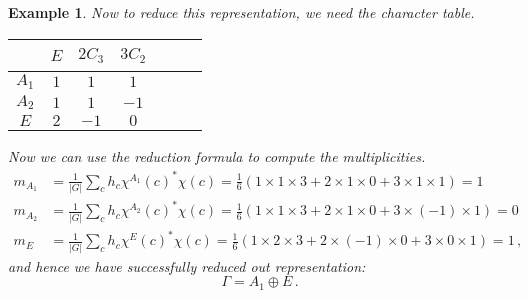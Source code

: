 \documentclass{article}
\theoremstyle{plain}\theoremheaderfont{\normalfont\itshape}\theorembodyfont{\rmfamily}\theoremseparator{.}\newtheorem*{rem}{Remark}\newtheorem*{ex}{Example}\newtheorem*{proof}{Proof}\newtheorem*{altp}{Alternative proof}
\theoremstyle{plain}\theoremheaderfont{\normalfont\bfseries}\theorembodyfont{\rmfamily}\theoremseparator{.}\newtheorem{thm}{Theorem}[section]\newtheorem{lem}[thm]{Lemma}\newtheorem{prop}[thm]{Proposition}\newtheorem*{cor}{Corollary}\newtheorem{defn}[thm]{Definition}\newtheorem{clm}[thm]{Claim}\newtheorem{clminproof}{Claim}\newtheorem*{law}{Law}\newtheorem{pos}[thm]{Postulate}
\theoremstyle{break}\theoremheaderfont{\normalfont\itshape}\theorembodyfont{\rmfamily}\theoremseparator{.\medskip}\newtheorem*{proofskip}{Proof}\newtheorem*{exs}{Examples}\newtheorem*{rems}{Remarks}
\theoremstyle{break}\theoremheaderfont{\normalfont\bfseries}\theorembodyfont{\rmfamily}\theoremseparator{.\medskip}\newtheorem{lemskip}[thm]{Lemma}\newtheorem{defnskip}[thm]{Definition}\newtheorem{propskip}[thm]{Proposition}\newtheorem{thmskip}[thm]{Theorem}
\numberwithin{equation}{section}
\newcommand{\abs}[1]{\left| #1 \right|}
\begin{document}
\begin{ex}
        Now to reduce this representation, we need the character table.
        \begin{table}[ht!]
            \centering
            \begin{tabular}{ccccccc}
                \toprule
                ~ & \(E\) & \(2C_3\) & \(3C_2\) \\ \midrule
                \(A_1\) & \(1\) & \(1\) & \(1\) \\
                \(A_2\) & \(1\) & \(1\) & \(-1\) \\
                \(E\) & \(2\) & \(-1\) & \(0\) \\ \bottomrule
            \end{tabular}
        \end{table}

        Now we can use the reduction formula to compute the multiplicities.
        \begin{align}
            m_{A_1}&=\frac{1}{\abs{G}}\sum_{c}h_c\chi^{A_1}(c)^*\chi(c)=\frac{1}{6}(1\times 1\times 3+2\times 1\times 0+3\times 1\times 1)=1\\
            m_{A_2}&=\frac{1}{\abs{G}}\sum_{c}h_c\chi^{A_2}(c)^*\chi(c)=\frac{1}{6}(1\times 1\times 3+2\times 1\times 0+3\times (-1)\times 1)=0\\
            m_{E}&=\frac{1}{\abs{G}}\sum_{c}h_c\chi^{E}(c)^*\chi(c)=\frac{1}{6}(1\times 2\times 3+2\times (-1)\times 0+3\times 0\times 1)=1\,,
        \end{align}
        and hence we have successfully reduced out representation:
        \begin{equation}
            \Gamma=A_1\oplus E\,.
        \end{equation}
    \end{ex}
\end{document}

